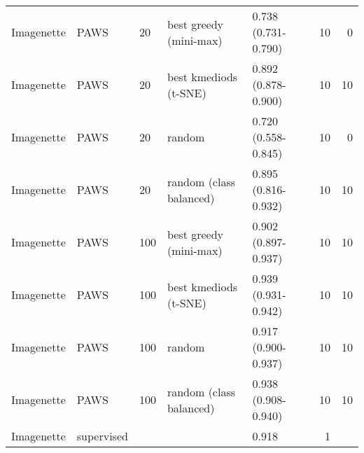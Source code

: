 \documentclass{article}
\begin{document}
\begin{table}[p]
\begin{tabular}{lllllrr}
  Imagenette & PAWS & 20 & best greedy (mini-max) & 0.738 (0.731-0.790) &  10 &   0 \\ 
  Imagenette & PAWS & 20 & best kmediods (t-SNE) & 0.892 (0.878-0.900) &  10 &  10 \\ 
  Imagenette & PAWS & 20 & random & 0.720 (0.558-0.845) &  10 &   0 \\ 
  Imagenette & PAWS & 20 & random (class balanced) & 0.895 (0.816-0.932) &  10 &  10 \\ 
  Imagenette & PAWS & 100 & best greedy (mini-max) & 0.902 (0.897-0.937) &  10 &  10 \\ 
  Imagenette & PAWS & 100 & best kmediods (t-SNE) & 0.939 (0.931-0.942) &  10 &  10 \\ 
  Imagenette & PAWS & 100 & random & 0.917 (0.900-0.937) &  10 &  10 \\ 
  Imagenette & PAWS & 100 & random (class balanced) & 0.938 (0.908-0.940) &  10 &  10 \\ 
  Imagenette & supervised &  &  & 0.918 &   1 &  \\ 
   \hline
\end{tabular}
 \normalsize
\end{table}

\FloatBarrier
\pagebreak


\end{document}
